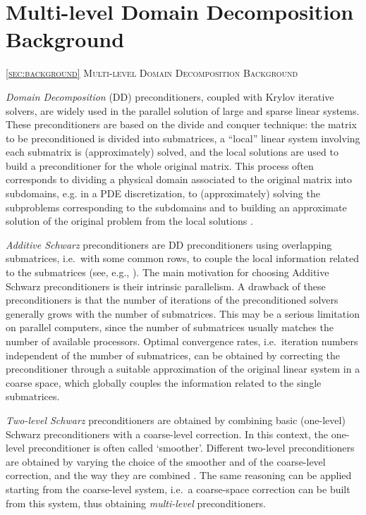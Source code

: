 \section{Multi-level Domain Decomposition Background\label{sec:background}}
         {\textsc{\ref{sec:background} Multi-level Domain Decomposition Background}}

\emph{Domain Decomposition} (DD) preconditioners, coupled with Krylov iterative
solvers, are widely used in the parallel solution of large and sparse linear systems.
These preconditioners are based on the divide and conquer technique: the matrix
to be preconditioned is divided into submatrices, a ``local'' linear system
involving each submatrix is (approximately) solved, and the local solutions are used
to build a preconditioner for the whole original matrix. This process
often corresponds to dividing a physical domain associated to the original matrix
into subdomains, e.g. in a PDE discretization, to (approximately) solving the
subproblems corresponding to the subdomains and to building an approximate
solution of the original problem from the local solutions 
\cite{Cai_Widlund_92,dd1_94,dd2_96}. 

\emph{Additive Schwarz} preconditioners are DD preconditioners using overlapping
submatrices, i.e.\ with some common rows, to couple the local information
related to the submatrices (see, e.g., \cite{dd2_96}).
The main motivation for choosing Additive Schwarz preconditioners is their
intrinsic parallelism. A drawback of these
preconditioners is that the number of iterations of the preconditioned solvers
generally grows with the number of submatrices. This may be a serious limitation
on parallel computers, since the number of submatrices usually matches the number
of available processors. Optimal convergence rates, i.e.\ iteration numbers
independent of the number of submatrices, can be obtained by correcting the
preconditioner through a suitable approximation of the original linear system
in a coarse space, which globally couples the information related to the single
submatrices. 

\emph{Two-level Schwarz} preconditioners are obtained
by combining basic (one-level) Sch\-warz preconditioners with a coarse-level
correction. In this context, the one-level preconditioner is often
called `smoother'. Different two-level preconditioners are obtained by varying the
choice of the smoother and of the coarse-level correction, and the
way they are combined \cite{dd2_96}. The same reasoning can be applied starting
from the coarse-level system, i.e.\ a coarse-space correction can be built
from this system, thus obtaining \emph{multi-level} preconditioners.

